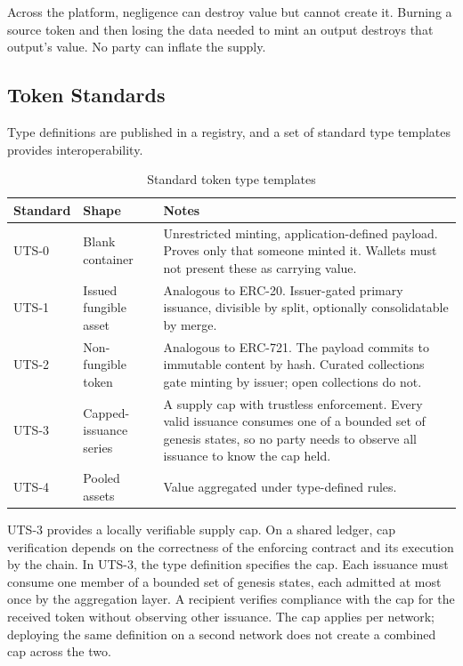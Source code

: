 Across the platform, negligence can destroy value but cannot create it. Burning a source token and then losing the data needed to mint an output destroys that output's value. No party can inflate the supply.

\subsection{Token Standards}

Type definitions are published in a registry, and a set of standard type templates provides interoperability.

\begin{table}[ht]
    \centering
    \caption{Standard token type templates}
    \label{tab:uts}
    \begin{tabular}{@{}llp{7.7cm}@{}}
        \toprule
        \textbf{Standard} & \textbf{Shape} & \textbf{Notes} \\
        \midrule
        UTS-0 & Blank container & Unrestricted minting, application-defined payload. Proves only that someone minted it. Wallets must not present these as carrying value. \\
        \addlinespace
        UTS-1 & Issued fungible asset & Analogous to ERC-20. Issuer-gated primary issuance, divisible by split, optionally consolidatable by merge. \\
        \addlinespace
        UTS-2 & Non-fungible token & Analogous to ERC-721. The payload commits to immutable content by hash. Curated collections gate minting by issuer; open collections do not. \\
        \addlinespace
        UTS-3 & Capped-issuance series & A supply cap with trustless enforcement. Every valid issuance consumes one of a bounded set of genesis states, so no party needs to observe all issuance to know the cap held. \\
        \addlinespace
        UTS-4 & Pooled assets & Value aggregated under type-defined rules. \\
        \bottomrule
    \end{tabular}
\end{table}

UTS-3 provides a locally verifiable supply cap. On a shared ledger, cap verification depends on the correctness of the enforcing contract and its execution by the chain. In UTS-3, the type definition specifies the cap. Each issuance must consume one member of a bounded set of genesis states, each admitted at most once by the aggregation layer. A recipient verifies compliance with the cap for the received token without observing other issuance. The cap applies per network; deploying the same definition on a second network does not create a combined cap across the two.

